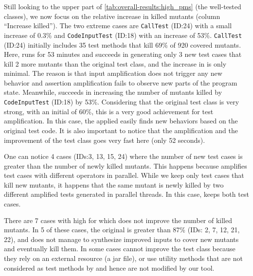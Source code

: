 Still looking to the upper part of \autoref{tab:overall-results:high_pms} (the well-tested classes), we now focus on the relative increase in killed mutants (column ``Increase killed''). 
The two extreme cases are \texttt{CallTest} (ID:24) with a small increase of 0.3\% and \texttt{CodeInputTest} (ID:18) with an increase of 53\%.
\texttt{CallTest} (ID:24) initially includes 35 test methods that kill 69\% of 920 covered mutants. Here, \dspot{} runs for 53 minutes and succeeds in generating only 3 new test cases that kill 2 more mutants than the original test class, and the increase in \ms is only minimal. The reason is that input amplification does not trigger any new behavior and assertion amplification fails to observe new parts of the program state. 
Meanwhile, \dspot{} succeeds in increasing the number of mutants killed by \texttt{CodeInputTest} (ID:18) by 53\%. Considering that the original test class is very strong, with an initial \ms of 60\%, this is a very good achievement for test amplification. In this case, the \Iampl applied easily finds new behaviors based on the original test code.
It is also important to notice that the amplification and the improvement of the test class goes very fast here (only 52 seconds). 

One can notice 4 cases (IDs:3, 13, 15, 24) where the number of new test cases is greater than the number of newly killed mutants. This happens because \dspot{} amplifies test cases with different operators in parallel. While we keep only test cases that kill new mutants, it happens that the same mutant is newly killed by two different amplified tests generated in parallel threads. In this case, \dspot{} keeps both test cases.

There are 7 cases with high \ms for which \dspot{} does not improve the number of killed mutants. In 5 of these cases, the original \ms is greater than 87\% (IDs: 2, 7, 12, 21, 22), and \dspot{} does not manage to synthesize improved inputs to cover new mutants and eventually kill them. In some cases \dspot{} cannot improve the test class because they rely on an external resource (a jar file), or use utility methods that are not considered as test methods by \dspot and hence are not modified by our tool.

